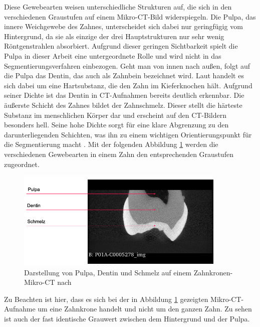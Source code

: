 Diese Gewebearten weisen unterschiedliche Strukturen auf, die sich in den
verschiedenen Graustufen auf einem Mikro-\ac{CT}-Bild widerspiegeln. Die Pulpa, das
innere Weichgewebe des Zahnes, unterscheidet sich dabei nur geringfügig vom
Hintergrund, da sie als einzige der drei Hauptstrukturen nur sehr wenig Röntgenstrahlen
absorbiert. Aufgrund dieser geringen Sichtbarkeit spielt die Pulpa in dieser
Arbeit eine untergeordnete Rolle und wird nicht in das Segmentierungsverfahren
einbezogen. Geht man von innen nach außen, folgt auf die Pulpa das Dentin, das auch
als Zahnbein bezeichnet wird. Laut \citet[S.~41]{lehmann2012Zahnheilkunde} handelt
es sich dabei um eine Hartsubstanz, die den Zahn im Kieferknochen hält. Aufgrund
seiner Dichte ist das Dentin in \ac{CT}-Aufnahmen bereits deutlich erkennbar. Die
äußerste Schicht des Zahnes bildet der Zahnschmelz. Dieser stellt die härteste
Substanz im menschlichen Körper dar und erscheint auf den \ac{CT}-Bildern besonders
hell. Seine hohe Dichte sorgt für eine klare Abgrenzung zu den darunterliegenden
Schichten, was ihn zu einem wichtigen Orientierungspunkt für die Segmentierung macht
\citep[vgl.][S.~41]{lehmann2012Zahnheilkunde}. Mit der folgenden Abbildung \ref{fig:pulpa_dentin_schmelz}
werden die verschiedenen Gewebearten in einem Zahn den entsprechenden Graustufen
zugeordnet.

\begin{figure}[h]
	\centering
	\includegraphics[width=0.9\textwidth]{img/dentin_schmelz_pulpa.png}
	\caption{Darstellung von Pulpa, Dentin und Schmelz auf einem Zahnkronen-Mikro-CT
	nach \citet{heck2024}}
	\label{fig:pulpa_dentin_schmelz}
\end{figure}

Zu Beachten ist hier, dass es sich bei der in Abbildung \ref{fig:pulpa_dentin_schmelz}
gezeigten Mikro-\ac{CT}-Aufnahme um eine Zahnkrone handelt und nicht um den
ganzen Zahn. Zu sehen ist auch der fast identische Grauwert zwischen dem Hintergrund
und der Pulpa.

